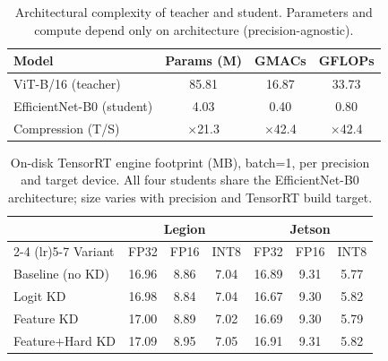 \begin{table}[t]
\centering
\caption{Architectural complexity of teacher and student. Parameters and compute depend only on architecture (precision-agnostic).}
\label{tab:complexity_arch}
\begin{tabular}{lccc}
\toprule
Model & Params (M) & GMACs & GFLOPs \\
\midrule
ViT-B/16 (teacher) & 85.81 & 16.87 & 33.73 \\
EfficientNet-B0 (student) & 4.03 & 0.40 & 0.80 \\
\midrule
Compression (T/S) & $\times$21.3 & $\times$42.4 & $\times$42.4 \\
\bottomrule
\end{tabular}
\end{table}

\begin{table}[t]
\centering
\caption{On-disk TensorRT engine footprint (MB), batch=1, per precision and target device. All four students share the EfficientNet-B0 architecture; size varies with precision and TensorRT build target.}
\label{tab:complexity_engines}
\begin{tabular}{lcccccc}
\toprule
 & \multicolumn{3}{c}{Legion} & \multicolumn{3}{c}{Jetson} \\
\cmidrule(lr){2-4} \cmidrule(lr){5-7}
Variant & FP32 & FP16 & INT8 & FP32 & FP16 & INT8 \\
\midrule
Baseline (no KD) & 16.96 & 8.86 & 7.04 & 16.89 & 9.31 & 5.77 \\
Logit KD & 16.98 & 8.84 & 7.04 & 16.67 & 9.30 & 5.82 \\
Feature KD & 17.00 & 8.89 & 7.02 & 16.69 & 9.30 & 5.79 \\
Feature+Hard KD & 17.09 & 8.95 & 7.05 & 16.91 & 9.31 & 5.82 \\
\bottomrule
\end{tabular}
\end{table}
